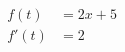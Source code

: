 \documentclass[preview]{standalone}
\begin{document}
\begin{align*}
f(t)&=2x+5 \\ f'(t)&=2
\end{align*}
\end{document}
